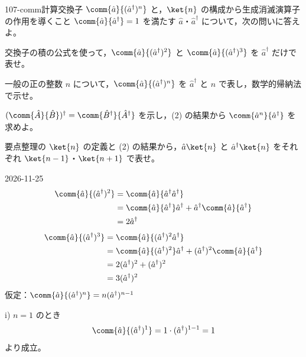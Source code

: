 \documentclass[uplatex,dvipdfmx,a4paper,11pt]{jsarticle}
\begin{document}
\begin{mondai}{107-comm}{計算}{交換子 $\comm{\hat{a}}{(\hat{a}^{\dagger})^{n}}$ と，$\ket{n}$ の構成から生成消滅演算子の作用を導くこと}
$\comm{\hat{a}}{\hat{a}^{\dagger}}=1$ を満たす $\hat{a}$・$\hat{a}^{\dagger}$ について，次の問いに答えよ。
  \begin{shoumon}
    \item 交換子の積の公式を使って，$\comm{\hat{a}}{(\hat{a}^{\dagger})^{2}}$ と $\comm{\hat{a}}{(\hat{a}^{\dagger})^{3}}$ を $\hat{a}^{\dagger}$ だけで表せ。
    \item 一般の正の整数 $n$ について，$\comm{\hat{a}}{(\hat{a}^{\dagger})^{n}}$ を $\hat{a}^{\dagger}$ と $n$ で表し，数学的帰納法で示せ。
    \item $(\comm{\hat{A}}{\hat{B}})^{\dagger}=\comm{\hat{B}^{\dagger}}{\hat{A}^{\dagger}}$ を示し，(2) の結果から $\comm{\hat{a}^{n}}{\hat{a}^{\dagger}}$ を求めよ。
    \item 要点整理の $\ket{n}$ の定義と (2) の結果から，$\hat{a}\ket{n}$ と $\hat{a}^{\dagger}\ket{n}$ をそれぞれ $\ket{n-1}$・$\ket{n+1}$ で表せ。
  \end{shoumon}
\begin{kotaeutsushi}{2026-11-25}
\begin{align*}
\comm{\hat{a}}{(\hat{a}^{\dagger})^{2}}&=\comm{\hat{a}}{\hat{a}^{\dagger}\hat{a}^{\dagger}}\\
&=\comm{\hat{a}}{\hat{a}^{\dagger}}\hat{a}^{\dagger}+\hat{a}^{\dagger}\comm{\hat{a}}{\hat{a}^{\dagger}}\\
&=2\hat{a}^{\dagger}
\end{align*}
\begin{align*}
\comm{\hat{a}}{(\hat{a}^{\dagger})^{3}}&=\comm{\hat{a}}{(\hat{a}^{\dagger})^{2}\hat{a}^{\dagger}}\\
&=\comm{\hat{a}}{(\hat{a}^{\dagger})^{2}}\hat{a}^{\dagger}+(\hat{a}^{\dagger})^{2}\comm{\hat{a}}{\hat{a}^{\dagger}}\\
&=2(\hat{a}^{\dagger})^{2}+(\hat{a}^{\dagger})^{2}\\
&=3(\hat{a}^{\dagger})^{2}
\end{align*}
仮定：$\comm{\hat{a}}{(\hat{a}^{\dagger})^{n}}=n(\hat{a}^{\dagger})^{n-1}$

i) $n=1$ のとき
\[ \comm{\hat{a}}{(\hat{a}^{\dagger})^{1}}=1\cdot(\hat{a}^{\dagger})^{1-1}=1 \]
より成立。


\end{kotaeutsushi}
\end{mondai}
\end{document}
